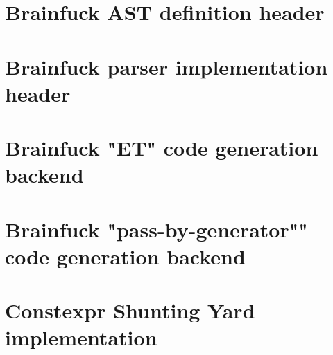 \documentclass[../main]{subfiles}
\begin{document}
\chapter*{
  Brainfuck AST definition header
}
\label{app:bf-ast}



\clearpage{} %

\chapter*{
  Brainfuck parser implementation header
}
\label{app:bf-parser}



\clearpage{} %

\chapter*{
  Brainfuck "ET" code generation backend
}
\label{app:bf-et-backend}



\clearpage{} %

\chapter*{
  Brainfuck "pass-by-generator"" code generation backend
}
\label{app:bf-pbg-backend}



\clearpage{} %

\chapter*{
  Constexpr Shunting Yard implementation
}
\label{app:shunting-yard-impl}


\end{document}
